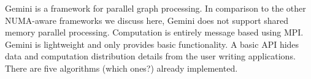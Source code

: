 
Gemini is a framework for parallel graph processing\cite{Gemini}.
In comparison to the other NUMA-aware frameworks we discuss here, Gemini does not support shared memory parallel processing.
Computation is entirely message based using MPI.
Gemini is lightweight and only provides basic functionality.
A basic API hides data and computation distribution details from the user writing applications.
There are five algorithms (which ones?) already implemented.
